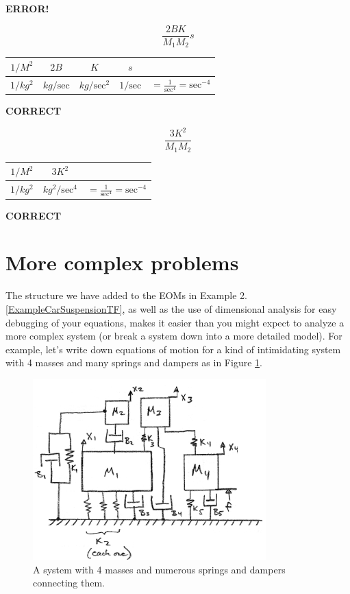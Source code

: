 \begin{Example}
\vspace{0.075in}
{\bf ERROR!}


\[
\frac{2BK}{M_1M_2}s
\]


\begin{tabular}{c|c|c|c|c}
$1/M^2$	  & $2B$		& $K$	& $s$ & \\ \hline
$1/kg^2$  & $kg/\mathrm{sec}$	& $kg/\mathrm{sec}^2$	& $1/\mathrm{sec}$	& $= \frac{1}{\mathrm{sec}^4} = \mathrm{sec}^{-4}$
\end{tabular}

\vspace{0.075in}
{\bf CORRECT}


\[
\frac{3K^2}{M_1M_2}
\]

\begin{tabular}{c|c|c}
$1/M^2$	& $3K^2$   & \\ \hline
$1/kg^2$  & $kg^2/\mathrm{sec}^4$	& $= \frac{1}{\mathrm{sec}^4} = \mathrm{sec}^{-4}$
\end{tabular}

\vspace{0.075in}
{\bf CORRECT}
\end{Example}

\section{More complex problems}
The structure we have added to the EOMs in Example 2.\ref{ExampleCarSuspensionTF}, as well as the
use of dimensional analysis for easy debugging of your equations, makes it easier than you
might expect to analyze a more complex system (or break a system down into a more detailed model).
For example, let's write down equations of motion for a kind of intimidating
system with 4 masses and many springs and
dampers as in Figure \ref{complexDynSystem}.


\begin{figure}\centering
\includegraphics[width=90mm]{figs02/00933a.png}
\caption{A system with 4 masses and numerous springs and dampers connecting them.}
\label{complexDynSystem}
\end{figure}

